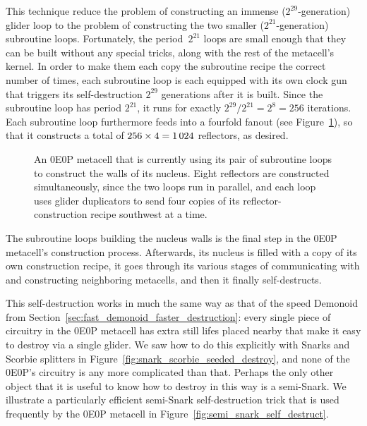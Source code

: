 This technique reduce the problem of constructing an immense ($2^{29}$-generation) glider loop to the problem of constructing the two smaller ($2^{21}$-generation) subroutine loops. Fortunately, the period~$2^{21}$ loops are small enough that they can be built without any special tricks, along with the rest of the metacell's kernel. In order to make them each copy the subroutine recipe the correct number of times, each subroutine loop is each equipped with its own clock gun that triggers its self-destruction $2^{29}$ generations after it is built. Since the subroutine loop has period $2^{21}$, it runs for exactly $2^{29}/2^{21} = 2^8 = 256$ iterations. Each subroutine loop furthermore feeds into a fourfold fanout (see Figure~\ref{fig:0e0p_subroutine}), so that it constructs a total of $256 \times 4 = 1{\,}024$ reflectors, as desired.

\begin{figure}[!htb]
	\centering
		\caption{An 0E0P metacell that is currently using its pair of subroutine loops to construct the walls of its nucleus. Eight reflectors are constructed simultaneously, since the two loops run in parallel, and each loop uses glider duplicators to send four copies of its reflector-construction recipe southwest at a time.}\label{fig:0e0p_subroutine}
\end{figure}

The subroutine loops building the nucleus walls is the final step in the 0E0P metacell's construction process. Afterwards, its nucleus is filled with a copy of its own construction recipe, it goes through its various stages of communicating with and constructing neighboring metacells, and then it finally self-destructs.

This self-destruction works in much the same way as that of the speed Demonoid from Section~\ref{sec:fast_demonoid_faster_destruction}: every single piece of circuitry in the 0E0P metacell has extra still lifes placed nearby that make it easy to destroy via a single glider. We saw how to do this explicitly with Snarks and Scorbie splitters in Figure~\ref{fig:snark_scorbie_seeded_destroy}, and none of the 0E0P's circuitry is any more complicated than that. Perhaps the only other object that it is useful to know how to destroy in this way is a semi-Snark. We illustrate a particularly efficient semi-Snark self-destruction trick that is used frequently by the 0E0P metacell in Figure~\ref{fig:semi_snark_self_destruct}.

